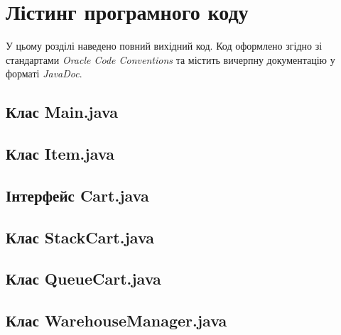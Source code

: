 \section{Лістинг програмного коду}

У цьому розділі наведено повний вихідний код. 
Код оформлено згідно зі стандартами \textit{Oracle Code Conventions} та містить 
вичерпну документацію у форматі \textit{JavaDoc}.
\subsection{Клас Main.java}

\newpage %
\subsection{Клас Item.java}

\newpage %
\subsection{Інтерфейс Cart.java}

\newpage %
\subsection{Клас StackCart.java}

\newpage %
\subsection{Клас QueueCart.java}

\newpage %
\subsection{Клас WarehouseManager.java}


